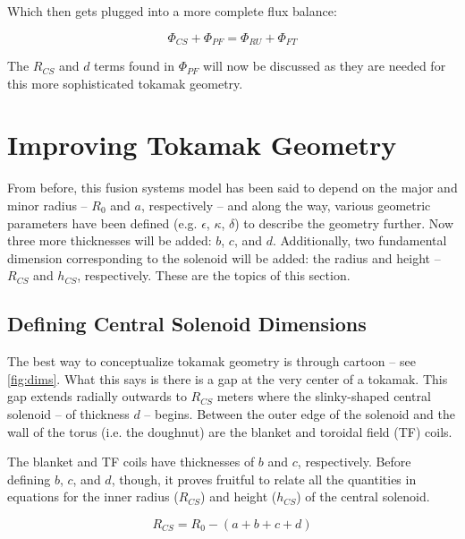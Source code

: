 Which then gets plugged into a more complete flux balance:

\begin{equation}
	\label{eq:full_ibal}
	\Phi_{CS} + \Phi_{PF} = \Phi_{RU} + \Phi_{FT}
\end{equation}

The $R_{CS}$ and $d$ terms found in $\Phi_{PF}$ will now be discussed as they are needed for this more sophisticated tokamak geometry.

\section{Improving Tokamak Geometry}

From before, this fusion systems model has been said to depend on the major and minor radius -- $R_0$ and $a$, respectively -- and along the way, various geometric parameters have been defined (e.g. $\epsilon$, $\kappa$, $\delta$) to describe the geometry further. Now three more thicknesses will be added: $b$, $c$, and $d$. Additionally, two fundamental dimension corresponding to the solenoid will be added: the radius and height -- $R_{CS}$ and $h_{CS}$, respectively. These are the topics of this section.

\subsection{Defining Central Solenoid Dimensions}

The best way to conceptualize tokamak geometry is through cartoon -- see \cref{fig:dims}. What this says is there is a gap at the very center of a tokamak. This gap extends radially outwards to $R_{CS}$ meters where the slinky-shaped central solenoid -- of thickness $d$ -- begins. Between the outer edge of the solenoid and the wall of the torus (i.e. the doughnut) are the blanket and toroidal field (TF) coils.

\begin{figure*}
\centering

\caption{Dimensions of Tokamak Cross-Section}
\label{fig:dims}
\end{figure*}

The blanket and TF coils have thicknesses of $b$ and $c$, respectively. Before defining $b$, $c$, and $d$, though, it proves fruitful to relate all the quantities in equations for the inner radius ($R_{CS}$) and height ($h_{CS}$) of the central solenoid.
 
 \begin{equation}
 	\label{eq:rcs1}
 	R_{CS} = R_0 - ( a + b + c + d )
 \end{equation}
 
